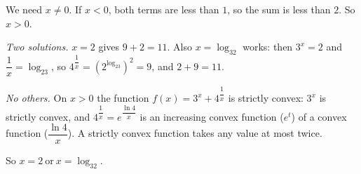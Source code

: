 We need $x\ne0$. If $x<0$, both terms are less than $1$, so the sum is less than $2$. So $x>0$.

\emph{Two solutions.} $x=2$ gives $9+2=11$. Also $x=\log_32$ works: then $3^x=2$ and $\dfrac1x=\log_23$, so $4^{\dfrac1x}=\left(2^{\log_23}\right)^2=9$, and $2+9=11$.

\emph{No others.} On $x>0$ the function $f(x)=3^x+4^{\dfrac1x}$ is strictly convex: $3^x$ is strictly convex, and $4^{\dfrac1x}=e^{\dfrac{\ln4}{x}}$ is an increasing convex function ($e^t$) of a convex function ($\dfrac{\ln4}{x}$). A strictly convex function takes any value at most twice.

So $\boxed{x=2\ \text{or}\ x=\log_32}$.
